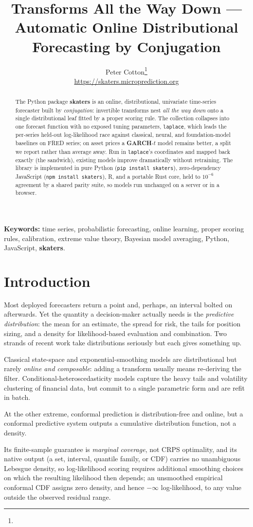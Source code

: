 \documentclass[article]{jss}
\author{
  Peter Cotton\thanks{\email{peter.cotton@microprediction.com}}\\
  \url{https://skaters.microprediction.org}
}
\title{Transforms All the Way Down --- Automatic Online Distributional Forecasting by Conjugation}
\providecommand{\proglang}[1]{\textsf{#1}}
\providecommand{\pkg}[1]{\textbf{#1}}
\providecommand{\code}[1]{\texttt{#1}}
\newcommand{\skatersabstract}{
The \proglang{Python} package \pkg{skaters} is an online, distributional,
univariate time-series forecaster built by \emph{conjugation}: invertible
transforms nest \emph{all the way down} onto a single distributional leaf
fitted by a proper scoring rule. The collection collapses into one forecast
function with no exposed tuning parameters, \code{laplace}, which leads the
per-series held-out log-likelihood race against classical, neural, and
foundation-model baselines on \proglang{FRED} series; on asset prices a
\pkg{GARCH}-$t$ model remains better, a split we report rather than average
away. Run in \code{laplace}'s coordinates and mapped back exactly (the
sandwich), existing models improve dramatically without retraining. The library is implemented in pure \proglang{Python}
(\code{pip install skaters}), zero-dependency \proglang{JavaScript}
(\code{npm install skaters}), \proglang{R}, and a portable \proglang{Rust}
core, held to $10^{-6}$ agreement by a shared parity suite, so models run
unchanged on a server or in a browser.
}
\begin{document}
\maketitle

\begin{abstract}
\skatersabstract
\end{abstract}

\noindent\textbf{Keywords:} time series, probabilistic forecasting, online
learning, proper scoring rules, calibration, extreme value theory, Bayesian
model averaging, \proglang{Python}, \proglang{JavaScript}, \pkg{skaters}.

\section{Introduction} \label{sec:intro}

Most deployed forecasters return a point and, perhaps, an interval bolted on
afterwards. Yet the quantity a decision-maker actually needs is the
\emph{predictive distribution}: the mean for an estimate, the spread for risk,
the tails for position sizing, and a density for likelihood-based evaluation and
combination. Two strands of recent work take distributions seriously but each
gives something up.

Classical state-space and exponential-smoothing models
\citep{hyndman2002state,hyndman2008automatic} are distributional but rarely
\emph{online and composable}: adding a transform usually means re-deriving the
filter. Conditional-heteroscedasticity models \citep{engle1982autoregressive,
bollerslev1986generalized} capture the heavy tails and volatility clustering of
financial data, but commit to a single parametric form and are refit in batch.

At the other extreme, conformal prediction
\citep{vovk2005algorithmic,vovk2019conformal} is distribution-free and online,
but a conformal predictive system outputs a cumulative distribution
function, not a density.

Its finite-sample guarantee is \emph{marginal
coverage}, not CRPS optimality, and its native output (a set, interval,
quantile family, or CDF) carries no unambiguous Lebesgue density, so
log-likelihood scoring requires additional smoothing choices on which the
resulting likelihood then depends; an unsmoothed empirical conformal CDF
assigns zero density, and hence $-\infty$ log-likelihood, to any value
outside the observed residual range.
\end{document}
